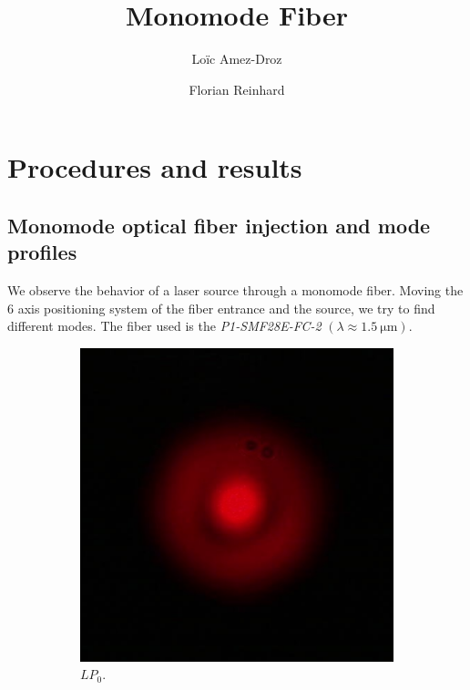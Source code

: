 \documentclass[a4paper, 12pt]{paper}
\author{Loïc Amez-Droz \and Florian Reinhard}
\title{Monomode Fiber}
\begin{document}

\section{Procedures and results}
\subsection{Monomode optical fiber injection and mode profiles}

We observe the behavior of a laser source through a monomode fiber.
Moving the 6 axis positioning system of the fiber entrance and the source, we try to find different modes.
The fiber used is the \emph{P1-SMF28E-FC-2} $\left( \lambda \approx \SI{1.5}{\micro\meter} \right)$.

\begin{figure}[H]
    \centering
    \begin{subfigure}[t]{0.3\textwidth}
        \includegraphics[width=\textwidth]{img/mode_2}
        \caption{$LP_{0}$.}
    \end{subfigure}
    \begin{subfigure}[t]{0.3\textwidth}

\end{subfigure}
\end{figure}
\end{document}
